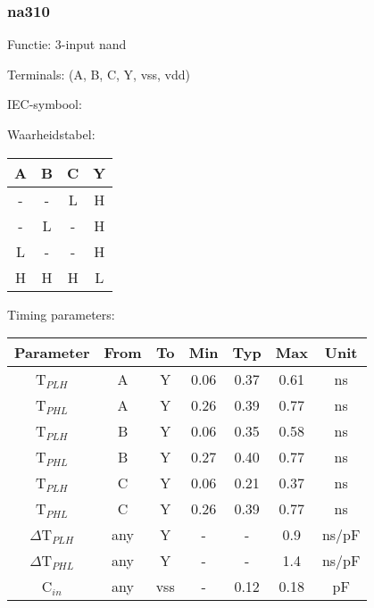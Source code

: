 \subsubsection{na310}

Functie: 3-input nand

Terminals: (A, B, C, Y, vss, vdd)


IEC-symbool:
\begin{figure}[bth]
\end{figure}

\begin{minipage}[t]{0.3\textwidth}
Waarheidstabel:\\

\begin{tabular}{|c|c|c||c|}
\hline
A	&B	&C	&Y\\
\hline
-	&-	&L	&H\\
-	&L	&-	&H\\
L	&-	&-	&H\\
H	&H	&H	&L\\
\hline
\end{tabular}
\end{minipage}
\hfill
\begin{minipage}[t]{0.6\textwidth}
Timing parameters:\\

\begin{tabular}{|c|cc|ccc|c|}
\hline
Parameter               &From            &To	&Min	&Typ	&Max    &Unit\\
\hline
T$_{PLH}$               &A     		&Y      &0.06	&0.37	&0.61    &ns\\
T$_{PHL}$               &A    		&Y      &0.26	&0.39	&0.77    &ns\\
T$_{PLH}$               &B     		&Y      &0.06	&0.35	&0.58    &ns\\
T$_{PHL}$               &B    		&Y      &0.27	&0.40	&0.77    &ns\\
T$_{PLH}$               &C     		&Y      &0.06	&0.21	&0.37    &ns\\
T$_{PHL}$               &C    		&Y      &0.26	&0.39	&0.77    &ns\\
\hline
$\Delta$T$_{PLH}$       &any          	&Y      &-	&-	&0.9    &ns/pF\\
$\Delta$T$_{PHL}$       &any           	&Y      &-	&-	&1.4    &ns/pF\\
\hline
C$_{in}$                &any	    	&vss    &-	&0.12   &0.18	&pF\\
\hline
\end{tabular}
\end{minipage}
\\

